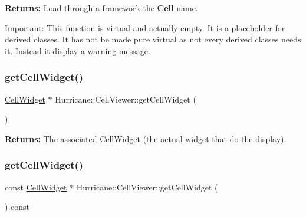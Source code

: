 {\bfseries Returns\+:} Load through a framework the \textbf{ Cell} {\ttfamily name}.

\begin{DoxyParagraph}{Important\+: This function is virtual and actually empty. It is a placeholder}
for derived classes. It has not be made pure virtual as not every derived classes needs it. Instead it display a warning message. 
\end{DoxyParagraph}
\mbox{\label{classHurricane_1_1CellViewer_a1d57547e30b1fb51aec2d0f254be6d3e}} 
\subsubsection{\texorpdfstring{get\+Cell\+Widget()}{getCellWidget()}\hspace{0.1cm}{\footnotesize\ttfamily [1/2]}}
{\footnotesize\ttfamily \mbox{\hyperlink{classHurricane_1_1CellWidget}{Cell\+Widget}} $\ast$ Hurricane\+::\+Cell\+Viewer\+::get\+Cell\+Widget (\begin{DoxyParamCaption}{ }\end{DoxyParamCaption})\hspace{0.3cm}{\ttfamily [inline]}}

{\bfseries Returns\+:} The associated \mbox{\hyperlink{classHurricane_1_1CellWidget}{Cell\+Widget}} (the actual widget that do the display). \mbox{\label{classHurricane_1_1CellViewer_acbfd53db10dd9de11acbb2940bce10bd}} 
\subsubsection{\texorpdfstring{get\+Cell\+Widget()}{getCellWidget()}\hspace{0.1cm}{\footnotesize\ttfamily [2/2]}}
{\footnotesize\ttfamily const \mbox{\hyperlink{classHurricane_1_1CellWidget}{Cell\+Widget}} $\ast$ Hurricane\+::\+Cell\+Viewer\+::get\+Cell\+Widget (\begin{DoxyParamCaption}{ }\end{DoxyParamCaption}) const\hspace{0.3cm}{\ttfamily [inline]}}

